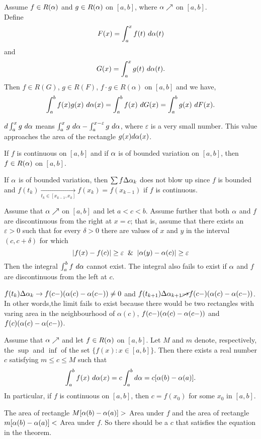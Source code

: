 \documentclass[10pt,a4paper]{book}
\begin{document}
\begin{Thm}
Assume $f \in R(\alpha)$ and $g \in R(\alpha)$ on $[a, b]$, where $\alpha \nearrow$ on $[a, b]$.\\
\noindent Define
$$F(x) = \int_a^x f(t)\  d \alpha(t)$$
and
$$G(x) = \int_a^x g(t)\ d \alpha(t).$$
Then $f \in R(G)$, $g \in R(F)$, $f\cdot g \in R(\alpha)$ on $[a,b]$ and we have,
$$\int_a^b f(x)g(x) \ d \alpha(x) = \int_a^b f(x)\ dG(x) = \int_a^b g(x)\ dF(x).$$
\end{Thm}
\PP $d\int_a^x g \ d \alpha$ means $\int_a^x g \ \da - \int_a^{x - \varepsilon} g \ \da $, where $\varepsilon$ is a very small number. This value approaches the area of the rectangle $g(x) d\alpha(x)$. 

\begin{Thm}
If $f$ is continuous on $[a, b]$ and if $\alpha$ is of bounded variation on $[a, b]$,
then $f \in R(\alpha)$ on $[a, b]$.
\end{Thm}
\PP If $\alpha$ is of bounded variation, then $\sum f \Delta \alpha_k$ does not blow up since $f$ is bounded and $f(t_k) \underset{t_k \in [x_{k-1}, x_k]} {\longrightarrow}f(x_k)=f(x_{k-1})$ if $f$ is continuous.
\newcommand{\ep}{\varepsilon}
\newcommand{\de}{\delta}

\begin{Thm}
Assume that $\alpha \nearrow$ on $[a, b]$ and let $a < c < b$. Assume further that both $\alpha$ and $f$ are discontinuous from the right at $x = c$; that is, assume that there
exists an $\ep>0$ such that for every $\de> 0 $ there are values of $x$ and $y$ in the interval $(c, c + \de)$ for which
    $$|f(x) - f(c)| \geq \ep \And |\al(y) - \al(c)| \geq \ep$$
Then the integral $\int_a^b f \ d \alpha$ cannot exist. The integral also fails to exist if $\alpha$ and $f$ are discontinuous from the left at $c$.
\end{Thm}
\PP $f(t_k)\Delta\alpha_k \rightarrow f(c-)(\alpha(c) - \alpha(c-)) \neq 0$ and $f(t_{k+1})\Delta\alpha_{k+1} \cancel{\rightarrow} f(c-)(\alpha(c) - \alpha(c-)) $. In other words,the limit fails to exist because there would be two rectangles with varing area in the neighbourhood of $\alpha(c)$, $f(c-)(\alpha(c) - \alpha(c-))$ and $f(c)(\alpha(c) - \alpha(c-))$.
\begin{Thm}
Assume that $\alpha \nearrow$ and let $f \in  R(\alpha)$ on $[a, b]$. Let $M$ and $m$ denote, respectively, the $\sup$ and $\inf$ of the set $\{f(x) : x \in [a, b]\}$. Then there exists a real number $c$ satisfying $m \leq c \leq M$ such that
$$\int_a^b f(x)\ d \alpha(x) =  c\int_a^b d \alpha =  c[\alpha(b) - \alpha(a)].$$
In particular, if $f$ is continuous on $[a, b]$, then $c = f(x_0)$ for some $x_0$ in $[a, b]$.

\end{Thm}
\PP The area of rectangle $M[\alpha(b) - \alpha(a)] > $ Area under $f$ and the area of rectangle $m[\alpha(b) - \alpha(a)] <$ Area under $f$. So there should be a $c$ that satisfies the equation in the theorem.
\end{document}
